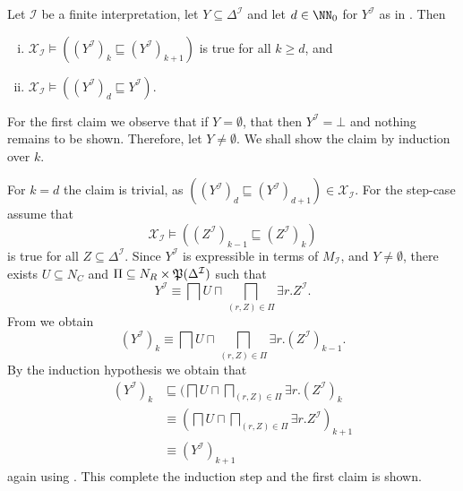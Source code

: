 \begin{Lemma}
  \label{lem:X_I-properties}
  Let $\mathcal{I}$ be a finite interpretation, let $Y \subseteq \Delta^{\mathcal{I}}$ and
  let $d \in \NN_0$ for $Y^{\mathcal{I}}$ as in .  Then
  \begin{enumerate}[i. ]
  \item $\mathcal{X}_{\mathcal{I}} \models ((Y^{\mathcal{I}})_k \sqsubseteq
    (Y^{\mathcal{I}})_{k+1})$ is true for all $k \geq d$, and
  \item $\mathcal{X}_{\mathcal{I}} \models ((Y^{\mathcal{I}})_d \sqsubseteq Y^{\mathcal{I}})$.
  \end{enumerate}
\end{Lemma}
\begin{Proof}
  For the first claim we observe that if $Y = \emptyset$, that then $Y^{\mathcal{I}} =
  \bot$ and nothing remains to be shown.  Therefore, let $Y \neq \emptyset$.  We shall
  show the claim by induction over $k$.

  For $k = d$ the claim is trivial, as $((Y^{\mathcal{I}})_d \sqsubseteq
  (Y^{\mathcal{I}})_{d+1}) \in \mathcal{X}_{\mathcal{I}}$.  For the step-case assume that
  \begin{equation}
    \label{eq:34}
    \mathcal{X}_{\mathcal{I}} \models ((Z^{\mathcal{I}})_{k-1} \sqsubseteq (Z^{\mathcal{I}})_k)
  \end{equation}
  is true for all $Z \subseteq \Delta^{\mathcal{I}}$.  Since $Y^{\mathcal{I}}$ is
  expressible in terms of $M_{\mathcal{I}}$, and $Y \neq \emptyset$, there exists $U
  \subseteq N_C$ and $\Pi \subseteq N_R \times {\ensuremath{\mathfrak{P}(\Delta^{\mathcal{I}})}}$ such that
  \begin{equation*}
    Y^{\mathcal{I}} \equiv \bigsqcap U \sqcap \bigsqcap_{(r, Z) \in \Pi} \exists r. Z^{\mathcal{I}}.
  \end{equation*}
  From  we obtain
  \begin{equation*}
    (Y^{\mathcal{I}})_k \equiv \bigsqcap U \sqcap \bigsqcap_{(r, Z) \in \Pi} \exists r.(Z^{\mathcal{I}})_{k-1}.
  \end{equation*}
  By the induction hypothesis  we obtain that
  \begin{align*}
    (Y^{\mathcal{I}})_k
    &\sqsubseteq (\bigsqcap U \sqcap \bigsqcap_{(r, Z) \in \Pi} \exists
    r. (Z^{\mathcal{I}})_k\\
    &\equiv (\bigsqcap U \sqcap \bigsqcap_{(r, Z) \in \Pi} \exists
    r. Z^{\mathcal{I}})_{k+1} \\
    &\equiv (Y^{\mathcal{I}})_{k+1}
  \end{align*}
  again using .  This complete the induction step
  and the first claim is shown.


\end{Proof}
